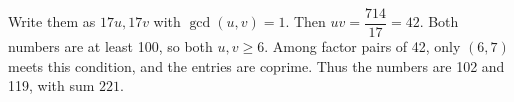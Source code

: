 Write them as $ 17u,17v $ with $\gcd(u,v)=1 $. Then $ uv=\dfrac{714}{17}=42 $. Both numbers are at least 100, so both $ u,v\ge6 $. Among factor pairs of 42, only $(6,7)$ meets this condition, and the entries are coprime. Thus the numbers are 102 and 119, with sum $\boxed{221}$.
